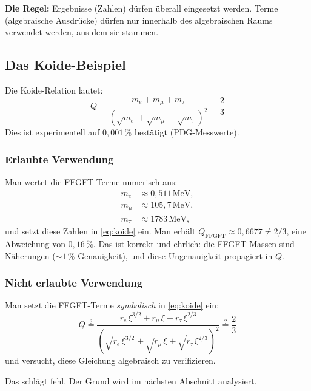 \textbf{Die Regel:} Ergebnisse (Zahlen) dürfen überall eingesetzt werden.
Terme (algebraische Ausdrücke) dürfen nur innerhalb des algebraischen Raums
verwendet werden, aus dem sie stammen.

\subsection{Das Koide-Beispiel}

Die Koide-Relation lautet:
\begin{equation}
  Q = \frac{m_e + m_\mu + m_\tau}{(\sqrt{m_e}+\sqrt{m_\mu}+\sqrt{m_\tau})^2}
  = \frac{2}{3}
  \label{eq:koide}
\end{equation}
Dies ist experimentell auf $0{,}001\,\%$ bestätigt (PDG-Messwerte).

\subsubsection*{Erlaubte Verwendung}

Man wertet die FFGFT-Terme numerisch aus:
\begin{align*}
  m_e &\approx 0{,}511\,\text{MeV}, \\
  m_\mu &\approx 105{,}7\,\text{MeV}, \\
  m_\tau &\approx 1783\,\text{MeV},
\end{align*}
und setzt diese Zahlen in \eqref{eq:koide} ein. Man erhält
$Q_{\text{FFGFT}} \approx 0{,}6677 \neq 2/3$, eine Abweichung von $0{,}16\,\%$.
Das ist korrekt und ehrlich: die FFGFT-Massen sind Näherungen
($\sim 1\,\%$ Genauigkeit), und diese Ungenauigkeit propagiert in $Q$.

\subsubsection*{Nicht erlaubte Verwendung}

Man setzt die FFGFT-Terme \emph{symbolisch} in \eqref{eq:koide} ein:
\begin{equation}
  Q \stackrel{?}{=}
  \frac{r_e\,\xi^{3/2} + r_\mu\,\xi + r_\tau\,\xi^{2/3}}
  {(\sqrt{r_e\,\xi^{3/2}}+\sqrt{r_\mu\,\xi}+\sqrt{r_\tau\,\xi^{2/3}})^2}
  \stackrel{?}{=} \frac{2}{3}
  \label{eq:falsch}
\end{equation}
und versucht, diese Gleichung algebraisch zu verifizieren.

Das schlägt fehl. Der Grund wird im nächsten Abschnitt analysiert.

